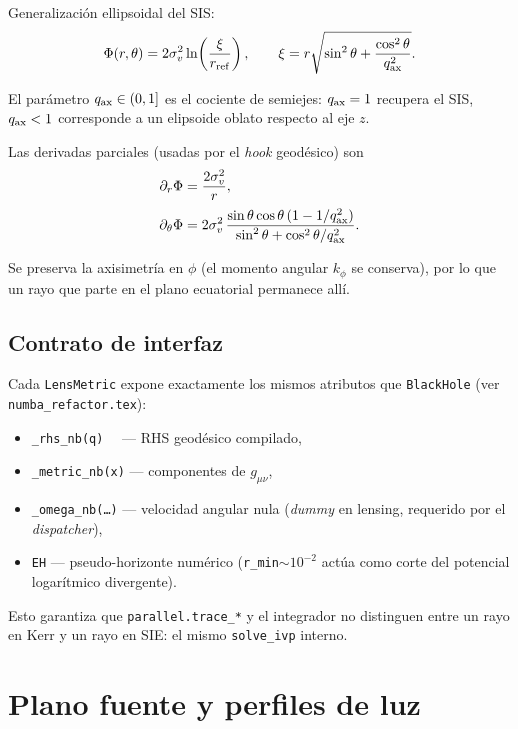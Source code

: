 \documentclass[11pt,a4paper]{article}
\begin{document}
Generalización ellipsoidal del SIS:
\begin{equation}
  \Phi(r,\theta) = 2\sigma_v^2 \ln\!\left(\frac{\xi}{r_{\rm ref}}\right),
  \qquad
  \xi = r\sqrt{\sin^2\theta + \frac{\cos^2\theta}{q_{\rm ax}^2}}.
\end{equation}

El parámetro $q_{\rm ax}\in(0,1]$ es el cociente de semiejes:
$q_{\rm ax} = 1$ recupera el SIS, $q_{\rm ax} < 1$ corresponde a un
elipsoide oblato respecto al eje $z$.

Las derivadas parciales (usadas por el \emph{hook} geodésico) son
\begin{align}
  \partial_r \Phi &= \frac{2\sigma_v^2}{r},\\[2pt]
  \partial_\theta \Phi &= 2\sigma_v^2\,
      \frac{\sin\theta\cos\theta\,(1 - 1/q_{\rm ax}^2)}
           {\sin^2\theta + \cos^2\theta/q_{\rm ax}^2}.
\end{align}

Se preserva la axisimetría en $\phi$ (el momento angular $k_\phi$ se
conserva), por lo que un rayo que parte en el plano ecuatorial permanece
allí.

\subsection{Contrato de interfaz}

Cada \texttt{LensMetric} expone exactamente los mismos atributos que
\texttt{BlackHole} (ver \texttt{numba\_refactor.tex}):
\begin{itemize}
  \item \texttt{\_rhs\_nb(q)} \ \ --- RHS geodésico compilado,
  \item \texttt{\_metric\_nb(x)} --- componentes de $g_{\mu\nu}$,
  \item \texttt{\_omega\_nb(\ldots)} --- velocidad angular nula
        (\emph{dummy} en lensing, requerido por el \emph{dispatcher}),
  \item \texttt{EH} --- pseudo-horizonte numérico
        (\texttt{r\_min}$\sim 10^{-2}$ actúa como corte del potencial
        logarítmico divergente).
\end{itemize}

Esto garantiza que \texttt{parallel.trace\_*} y el integrador no distinguen
entre un rayo en Kerr y un rayo en SIE: el mismo \texttt{solve\_ivp}
interno.


\section{Plano fuente y perfiles de luz}
\end{document}
